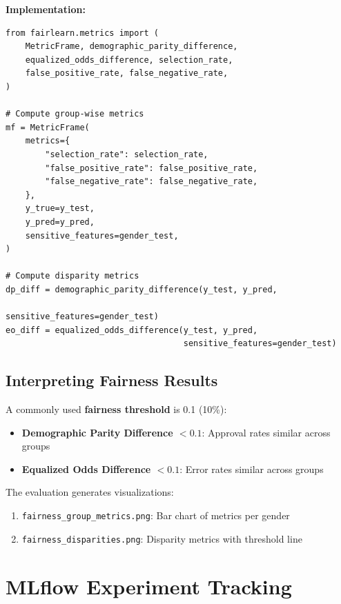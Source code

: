 \documentclass[11pt,a4paper]{article}
\begin{document}
\textbf{Implementation:}
\begin{lstlisting}[style=pythonstyle]
from fairlearn.metrics import (
    MetricFrame, demographic_parity_difference,
    equalized_odds_difference, selection_rate,
    false_positive_rate, false_negative_rate,
)

# Compute group-wise metrics
mf = MetricFrame(
    metrics={
        "selection_rate": selection_rate,
        "false_positive_rate": false_positive_rate,
        "false_negative_rate": false_negative_rate,
    },
    y_true=y_test,
    y_pred=y_pred,
    sensitive_features=gender_test,
)

# Compute disparity metrics
dp_diff = demographic_parity_difference(y_test, y_pred,
                                        sensitive_features=gender_test)
eo_diff = equalized_odds_difference(y_test, y_pred,
                                    sensitive_features=gender_test)
\end{lstlisting}

\subsection{Interpreting Fairness Results}

A commonly used \textbf{fairness threshold} is 0.1 (10\%):
\begin{itemize}
    \item \textbf{Demographic Parity Difference $< 0.1$}: Approval rates similar across groups
    \item \textbf{Equalized Odds Difference $< 0.1$}: Error rates similar across groups
\end{itemize}

The evaluation generates visualizations:
\begin{enumerate}
    \item \texttt{fairness\_group\_metrics.png}: Bar chart of metrics per gender
    \item \texttt{fairness\_disparities.png}: Disparity metrics with threshold line
\end{enumerate}

\section{MLflow Experiment Tracking}
\end{document}
